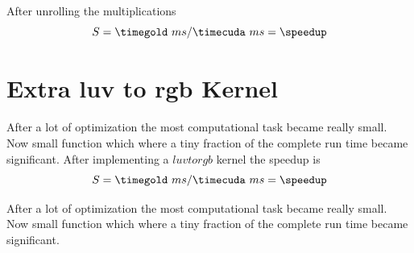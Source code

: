 After unrolling the multiplications 
\fpDiv{\speedup}{\timegold}{\timecuda}
\begin{equation*}\label{eq:speedup11}
	S = \timegold\ ms/\timecuda\ ms = \speedup
\end{equation*}

\section{Extra luv to rgb Kernel}

After a lot of optimization the most computational task became really small. Now
small function which where a tiny fraction of the complete run time became 
significant. 
After implementing a $luvtorgb$ kernel the speedup is 
\fpDiv{\speedup}{\timegold}{\timecuda}
\begin{equation*}\label{eq:speedup12}
	S = \timegold\ ms/\timecuda\ ms = \speedup
\end{equation*}



After a lot of optimization the most computational task became really small. Now
small function which where a tiny fraction of the complete run time became 
significant. 




